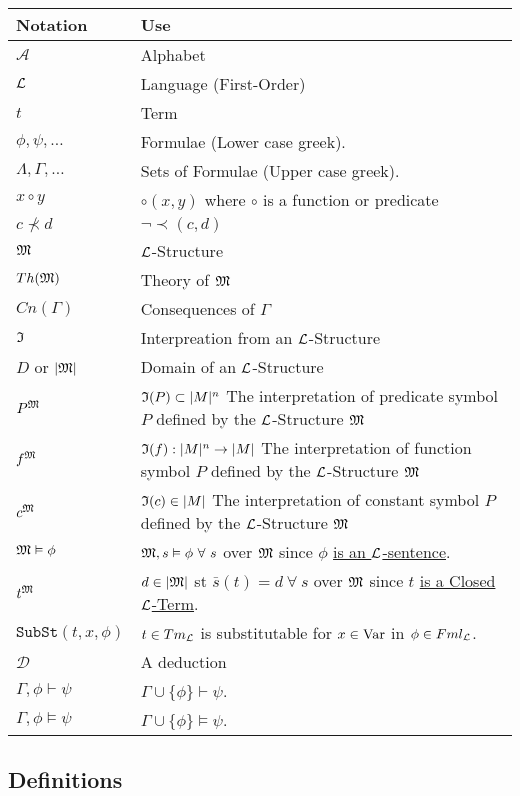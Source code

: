 \documentclass[11pt,a4paper]{article}
\begin{document}
\begin{center}\begin{tabular}{|l|l|}
\hline
\textbf{Notation}&\textbf{Use}\\
\hline$\mathcal{A}$&Alphabet\\
$\mathcal{L}$&Language (First-Order)\\
$t$&Term\\
$\phi,\psi,\dots$&Formulae (Lower case greek).\\
$\Lambda,\Gamma,\dots$&Sets of Formulae (Upper case greek).\\
$x\circ y$&$\circ(x,y)$ where $\circ$ is a function or predicate\\
$c\not\prec d$&$\neg\prec(c,d)$\\
$\mathfrak{M}$&$\mathcal{L}$-Structure\\
$Th(\mathfrak{M})$&Theory of $\mathfrak{M}$\\
$Cn(\Gamma)$&Consequences of $\Gamma$\\
$\mathfrak{I}$&Interpreation from an $\mathcal{L}$-Structure\\
$D$ or $|\mathfrak{M}|$&Domain of an $\mathcal{L}$-Structure\\
$P^{\mathfrak{M}}$&$\mathfrak{I}(P)\subset|M|^n$ The interpretation of predicate symbol $P$ defined by the $\mathcal{L}$-Structure $\mathfrak{M}$\\
$f^{\mathfrak{M}}$&$\mathfrak{I}(f):|M|^n\to|M|$ The interpretation of function symbol $P$ defined by the $\mathcal{L}$-Structure $\mathfrak{M}$\\
$c^{\mathfrak{M}}$&$\mathfrak{I}(c)\in|M|$ The interpretation of constant symbol $P$ defined by the $\mathcal{L}$-Structure $\mathfrak{M}$\\
$\mathfrak{M}\vDash\phi$&$\M,s\vDash\phi\ \forall\ s$ over $\mathfrak{M}$ since $\phi$ \underline{is an $\mathcal{L}$-sentence}.\\
$t^{\mathfrak{M}}$&$d\in|\mathfrak{M}|$ st $\bar{s}(t)=d\ \forall\ s$ over $\mathfrak{M}$ since $t$ \underline{is a Closed $\mathcal{L}$-Term}.\\
$\mathtt{SubSt}(t,x,\phi)$&$t\in Tm_{\mathcal{L}}$ is substitutable for $x\in\mathrm{Var}$ in $\phi\in Fml_{\mathcal{L}}$.\\
$\mathcal{D}$&A deduction\\
$\Gamma,\phi\vdash\psi$&$\Gamma\cup\{\phi\}\vdash\psi$.\\
$\Gamma,\phi\vDash\psi$&$\Gamma\cup\{\phi\}\vDash\psi$.\\
\hline
\end{tabular}\end{center}

\subsection{Definitions}
\end{document}
